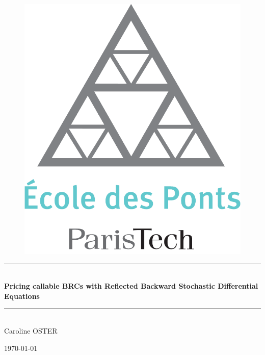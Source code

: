 \documentclass[a4paper,11pt,english]{book}
\begin{document}

\frontmatter
\begin{titlepage}
\begin{center}
\begin{figure}[H] 
    \centering
    \includegraphics[scale=0.2]{images/Logo_ponts_paristech.png} 
    \vspace{4ex}
\end{figure}
\rule{\linewidth}{0.5mm} \\[0.4cm]
{ \LARGE \bfseries Pricing callable BRCs with Reflected Backward Stochastic Differential Equations \\
}
\rule{\linewidth}{0.5mm} \\[1cm]


Caroline \textsc{OSTER}

\noindent

\vspace{4cm}

{\today}
\end{center}
\end{titlepage}
\newpage
\end{document}
